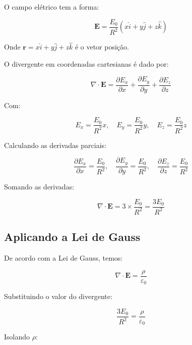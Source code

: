 \documentclass[a4paper,12pt]{article}
\begin{document}
\begin{flushleft}
O campo elétrico tem a forma:

\begin{equation}
\mathbf{E} = \frac{E_0}{R^2} (x \hat{i} + y \hat{j} + z \hat{k})
\end{equation}

Onde \( \mathbf{r} = x \hat{i} + y \hat{j} + z \hat{k} \) é o vetor posição.

O divergente em coordenadas cartesianas é dado por:

\begin{equation}
\nabla \cdot \mathbf{E} = \frac{\partial E_x}{\partial x} + \frac{\partial E_y}{\partial y} + \frac{\partial E_z}{\partial z}
\end{equation}

Com:

\begin{equation}
E_x = \frac{E_0}{R^2} x, \quad E_y = \frac{E_0}{R^2} y, \quad E_z = \frac{E_0}{R^2} z
\end{equation}

Calculando as derivadas parciais:

\begin{equation}
\frac{\partial E_x}{\partial x} = \frac{E_0}{R^2}, \quad \frac{\partial E_y}{\partial y} = \frac{E_0}{R^2}, \quad \frac{\partial E_z}{\partial z} = \frac{E_0}{R^2}
\end{equation}

Somando as derivadas:

\begin{equation}
\nabla \cdot \mathbf{E} = 3 \times \frac{E_0}{R^2} = \frac{3 E_0}{R^2}
\end{equation}

\subsection*{Aplicando a Lei de Gauss}

De acordo com a Lei de Gauss, temos:

\begin{equation}
\nabla \cdot \mathbf{E} = \frac{\rho}{\varepsilon_0}
\end{equation}

Substituindo o valor do divergente:

\begin{equation}
\frac{3 E_0}{R^2} = \frac{\rho}{\varepsilon_0}
\end{equation}

Isolando \( \rho \):


\end{flushleft}
\end{document}
